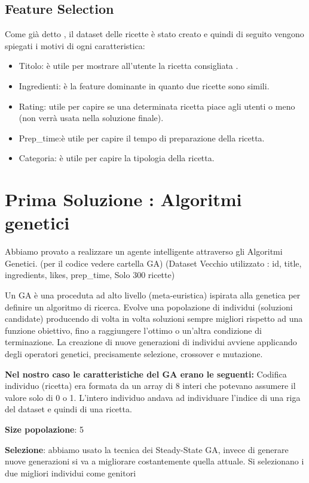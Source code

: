 \documentclass[12pt]{report}
\begin{document}
\section{Feature Selection}
Come già detto , il dataset delle ricette è stato creato e quindi di seguito vengono spiegati i motivi di ogni caratteristica:
\begin{itemize}
	\item Titolo: è utile per mostrare all’utente la ricetta consigliata .
	\item Ingredienti: è la feature dominante in quanto due ricette sono simili.
	\item Rating: utile per capire se una determinata ricetta piace agli utenti o meno (non verrà usata nella soluzione finale).
	\item Prep\_time:è utile per capire il tempo di preparazione della ricetta.
	\item Categoria: è utile per capire la tipologia della ricetta.
 \end{itemize}

\chapter{Prima Soluzione : Algoritmi genetici}
Abbiamo provato a realizzare un agente intelligente attraverso gli Algoritmi Genetici. (per il codice vedere cartella GA) (Dataset Vecchio utilizzato : id, title, ingredients, likes, prep\_time, Solo 300 ricette)

Un GA è una proceduta ad alto livello (meta-euristica) ispirata alla genetica per definire un algoritmo di ricerca. Evolve una popolazione di individui (soluzioni candidate) producendo di volta in volta soluzioni sempre migliori rispetto ad una funzione obiettivo, fino a raggiungere l’ottimo o un’altra condizione di terminazione. La creazione di nuove generazioni di individui avviene applicando degli operatori genetici, precisamente selezione, crossover e mutazione.

\textbf{Nel nostro caso le caratteristiche del GA erano le seguenti:}
Codifica individuo (ricetta) era formata da un array di 8 interi che potevano assumere il valore solo di 0 o 1. L’intero individuo andava ad individuare l’indice di una riga del dataset e quindi di una ricetta.

\textbf{Size popolazione}: 5

\textbf{Selezione}: abbiamo usato la tecnica dei Steady-State GA, invece di generare nuove generazioni si va a migliorare costantemente quella attuale. Si selezionano i due migliori individui come genitori
\end{document}

